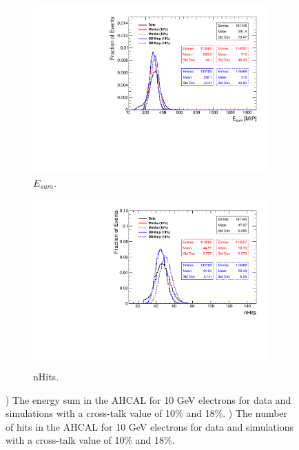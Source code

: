 \begin{figure}[htbp!]
	\centering
	\begin{subfigure}[t]{0.49\textwidth}
		\includegraphics[width=1.\linewidth]{../Thesis_Plots/Timing/Electrons/Plots/Comparison_EnergySum_Xtalk_electrons10GeV.pdf}
		\caption{$E_{sum}$.} \label{fig:e10Evis}
	\end{subfigure}
	\hfill
	\begin{subfigure}[t]{0.49\textwidth}
		\includegraphics[width=1.\linewidth]{../Thesis_Plots/Timing/Electrons/Plots/Comparison_nHits_Xtalk_electrons10GeV.pdf}
		\caption{nHits.} \label{fig:e10nHits}
	\end{subfigure}
	\caption{) The energy sum in the AHCAL for 10 GeV electrons for data and simulations with a cross-talk value of 10\% and 18\%. ) The number of hits in the AHCAL for 10 GeV electrons for data and simulations with a cross-talk value of 10\% and 18\%.}
	\label{fig:e10Val}
\end{figure}

